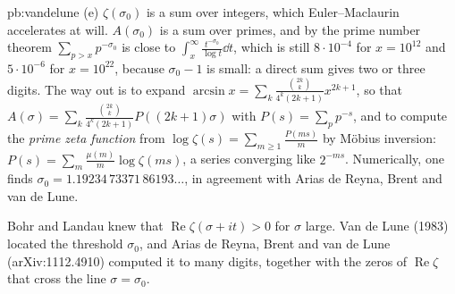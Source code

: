 \begin{solution}{pb:vandelune}
(e) $\zeta(\sigma_0)$ is a sum over integers, which Euler--Maclaurin accelerates at will. $A(\sigma_0)$ is a sum over primes, and by the prime number theorem $\sum_{p>x}p^{-\sigma_0}$ is close to
$\int_x^\infty\frac{t^{-\sigma_0}}{\log t}\dd t$, which is still $8\cdot10^{-4}$ for $x=10^{12}$ and $5\cdot10^{-6}$ for $x=10^{22}$, because $\sigma_0-1$ is small: a direct sum gives two or
three digits. The way out is to expand
$\arcsin x=\sum_k\frac{\binom{2k}k}{4^k(2k+1)}x^{2k+1}$, so that $A(\sigma)=\sum_k\frac{\binom{2k}k}{4^k(2k+1)}P((2k+1)\sigma)$ with $P(s)=\sum_pp^{-s}$, and to compute the \emph{prime zeta
function} from $\log\zeta(s)=\sum_{m\ge1}\frac{P(ms)}m$ by Möbius inversion: $P(s)=\sum_m\frac{\mu(m)}m\log\zeta(ms)$, a series converging like $2^{-ms}$. Numerically, one finds
$\sigma_0=1.19234\,73371\,86193\ldots$, in agreement with Arias de Reyna, Brent and van de Lune.

\leads Bohr and Landau knew that $\operatorname{Re}\zeta(\sigma+it)>0$ for $\sigma$ large. Van de Lune (1983) located the threshold $\sigma_0$, and Arias de Reyna, Brent and van de Lune
(arXiv:1112.4910) computed it to many digits, together with the zeros of $\operatorname{Re}\zeta$ that cross the line $\sigma=\sigma_0$.
\end{solution}

